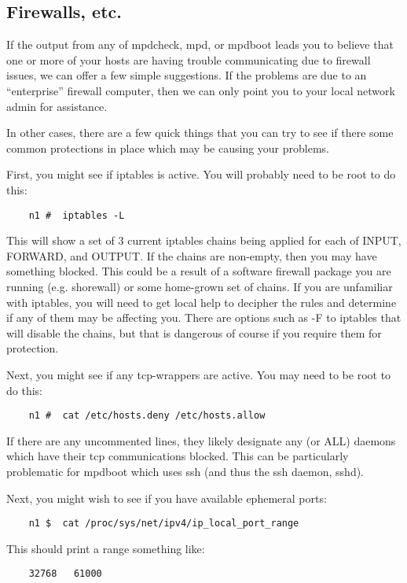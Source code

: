 \documentclass[dvipdfm,11pt]{article}
\begin{document}
\subsection{Firewalls, etc.}

If the output from any of mpdcheck, mpd, or mpdboot leads you to believe
that one or more of your hosts are having trouble communicating due to
firewall issues, we can offer a few simple suggestions.  If the problems
are due to an ``enterprise'' firewall computer, then we can only point you
to your local network admin for assistance.

In other cases, there are a few quick things that you can try to see if
there some common protections in place which may be causing your problems.

First, you might see if iptables is active.  You will probably need to
be root to do this:
\begin{verbatim}
    n1 #  iptables -L
\end{verbatim}
This will show a set of 3 current iptables chains being applied for each
of INPUT, FORWARD, and OUTPUT.  If the chains are non-empty, then you may
have something blocked.  This could be a result of a software firewall 
package you are running (e.g. shorewall) or some home-grown set of chains.
If you are unfamiliar with iptables, you will need to get local help to 
decipher the rules and determine if any of them may be affecting you.  There
are options such as -F to iptables that will disable the chains, but that is
dangerous of course if you require them for protection.

Next, you might see if any tcp-wrappers are active.  You may need to be 
root to do this:
\begin{verbatim}
    n1 #  cat /etc/hosts.deny /etc/hosts.allow
\end{verbatim}
If there are any uncommented lines, they likely designate any (or ALL)
daemons which have their tcp communications blocked.  This can be
particularly problematic for mpdboot which uses ssh (and thus the ssh
daemon, sshd).

Next, you might wish to see if you have available ephemeral ports:
\begin{verbatim}
    n1 $  cat /proc/sys/net/ipv4/ip_local_port_range
\end{verbatim}
This should print a range something like:
\begin{verbatim}
    32768   61000
\end{verbatim}
\end{document}
